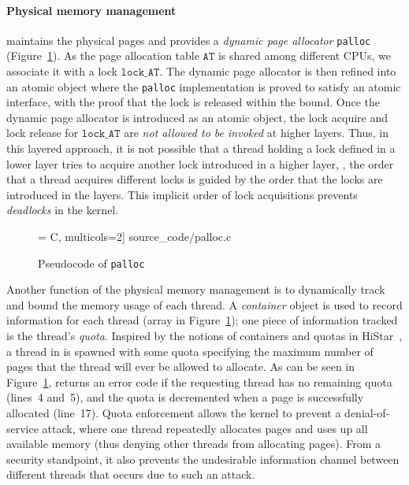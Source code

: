 {\vspace{-3pt}
\paragraph{Physical memory management}
\label{sec:base:memm}
maintains the physical pages and provides a \emph{dynamic page allocator}
\texttt{palloc} (\cf Figure~\ref{fig:exp:palloc}).
As the page allocation table $\texttt{AT}$ is shared among different CPUs, 
we associate it with a lock $\texttt{lock\_AT}$.
The dynamic page allocator is then refined into an atomic object where
the \texttt{palloc} implementation is proved to satisfy an atomic interface,
with the proof that the lock is released within the bound.
Once the dynamic page allocator is introduced as
 an atomic object, the lock acquire and lock release 
for $\texttt{lock\_AT}$
are \emph{not allowed to be invoked} at higher layers. 
Thus, in this layered approach, it is not possible
that a thread holding a lock defined in a lower layer tries to acquire another lock
introduced in a higher layer, \ie, the order that a thread acquires different
locks is guided by the order that the locks are introduced in the layers.
This implicit order of lock acquisitions prevents \emph{deadlocks} in the
{\mCTOS} kernel.

\begin{figure}[t]
 = C, multicols=2] {source_code/palloc.c}
\caption{Pseudocode of \texttt{palloc}}
\label{fig:exp:palloc}
\hrulefill
\end{figure}



Another function of the physical memory management is to dynamically
track and bound the memory usage of each thread. A \emph{container}
object is used to record information for each thread (array 
in Figure~\ref{fig:exp:palloc}); one piece of information tracked is the
thread's \emph{quota}. Inspired by the notions of containers and
quotas in HiStar~\cite{zeldovich06}, a thread
in {\mCTOS} is spawned with some quota specifying the maximum number
of pages that the thread will ever be allowed to allocate. As can be
seen in Figure~\ref{fig:exp:palloc},  returns an error
code if the requesting thread has no remaining quota (lines~4 and~5), 
and the quota is decremented when a page is successfully allocated (line~17).
Quota enforcement allows the kernel to prevent a denial-of-service attack,
where one thread repeatedly allocates pages and uses up all available
memory (thus denying other threads from allocating pages). From a security
standpoint, it also prevents the undesirable information channel between 
different threads that occurs due to such an attack.


}

